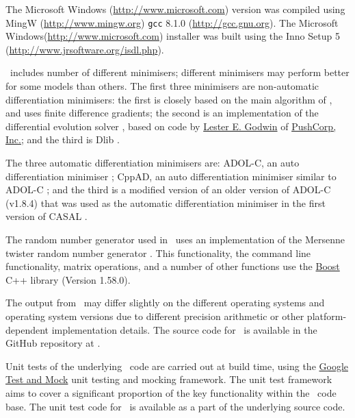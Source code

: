 The Microsoft Windows (\url{http://www.microsoft.com}) version was compiled using MingW (\url{http://www.mingw.org}) \texttt{gcc} 8.1.0 (\url{http://gcc.gnu.org}). The Microsoft Windows(\url{http://www.microsoft.com}) installer was built using the Inno Setup 5 (\url{http://www.jrsoftware.org/isdl.php}).

\CNAME\ includes number of different minimisers; different minimisers may perform better for some models than others. The first three minimisers are non-automatic differentiation minimisers: the first is closely based on the main algorithm of \cite{779}, and uses finite difference gradients; the second is an implementation of the differential evolution solver \citep{1442}, based on code by \href{mailto:<godwin@pushcorp.com>}{Lester E. Godwin} of \href{http://www.pushcorp.com}{PushCorp, Inc.}; and the third is Dlib \citep{dlib09}.

The three automatic differentiation minimisers are: ADOL-C, an auto differentiation minimiser \citep{walther1996adolc}; CppAD, an auto differentiation minimiser similar to ADOL-C \citep{wachter2006cppad}; and the third is a modified version of an older version of ADOL-C (v1.8.4) that was used as the automatic differentiation minimiser in the first version of CASAL \citep{1388}.

The random number generator used in \CNAME\ uses an implementation of the Mersenne twister random number generator \citep{796}. This functionality, the command line functionality, matrix operations, and a number of other functions use the \href{http://www.boost.org/}{Boost} C++ library (Version 1.58.0).

The output from \CNAME\ may differ slightly on the different operating systems and operating system versions due to different precision arithmetic or other platform-dependent implementation details. The source code for \CNAME\ is available in the GitHub repository at \github.

Unit tests of the underlying \CNAME\ code are carried out at build time, using the \href{https://github.com/google/googletest}{Google Test and Mock} unit testing and mocking framework. The unit test framework aims to cover a significant proportion of the key functionality within the \CNAME\ code base. The unit test code for \CNAME\ is available as a part of the underlying source code.

